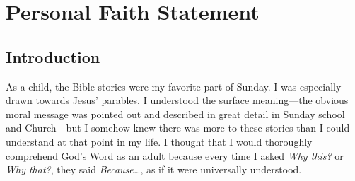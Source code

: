 \documentclass{report}%
\title{}
\author{Dr. Karen Tatum}
\begin{document}
\pagestyle{empty}
\chapter*{Personal Faith Statement}
\section*{Introduction}
As a child, the Bible stories were my favorite part of Sunday. %
I was especially drawn towards Jesus' parables. 
I understood the surface meaning---the obvious moral message was pointed out and described in great detail in Sunday school and Church---but I somehow knew there was more to these stories than I could understand at that point in my life. 
I thought that I would thoroughly comprehend God's Word as an adult because every time I asked \emph{Why this?} or \emph{Why that?}, they said \emph{Because\dots}, as if it were universally understood. %

 
\end{document}
